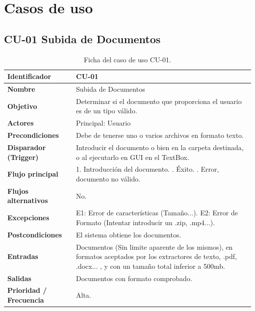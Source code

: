 \section{Casos de uso}

\newpage
\subsection{CU-01 Subida de Documentos}
\begin{table}[H]
\centering
\renewcommand{\arraystretch}{1.3} %
\begin{tabularx}{\textwidth}{|l|X|}
\hline
\textbf{Identificador} & CU-01 \\
\hline
\textbf{Nombre} & Subida de Documentos \\
\hline
\textbf{Objetivo} & Determinar si el documento que proporciona el usuario es de un tipo válido. \\
\hline
\textbf{Actores} & Principal: Usuario \\
\hline
\textbf{Precondiciones} & Debe de tenerse uno o varios archivos en formato texto. \\
\hline
\textbf{Disparador (Trigger)} & Introducir el documento o bien en la carpeta destinada, o al ejecutarlo en GUI en el TextBox. \\
\hline
\textbf{Flujo principal} &
1. Introducción del documento. \newline
2. Éxito. \newline
3. Error, documento no válido. \\
\hline
\textbf{Flujos alternativos} & No. \\
\hline
\textbf{Excepciones} & E1: Error de características (Tamaño...). \newline E2: Error de Formato (Intentar introducir un .zip, .mp4...). \\
\hline
\textbf{Postcondiciones} & El sistema obtiene los documentos. \\
\hline
\textbf{Entradas} & Documentos (Sin limite aparente de los mismos), en formatos aceptados por los extractores de texto, .pdf, .docx... , y con un tamaño total inferior a 500mb. \\
\hline
\textbf{Salidas} & Documentos con formato comprobado. \\
\hline
\textbf{Prioridad / Frecuencia} & Alta. \\
\hline
\end{tabularx}
\caption{Ficha del caso de uso CU-01.}
\label{tab:CU-01}
\end{table}

